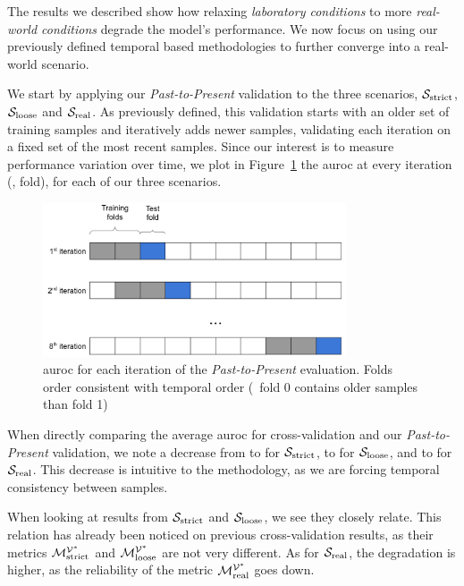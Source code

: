 The results we described show how relaxing \textit{laboratory conditions} to more \textit{real-world conditions} degrade the model's performance.
We now focus on using our previously defined temporal based methodologies to further converge into a real-world scenario.

\medskip

We start by applying our \textit{Past-to-Present} validation to the three scenarios, $\mathcal{S}_{\mathrm{strict}}$, $\mathcal{S}_{\mathrm{loose}}$ and $\mathcal{S}_{\mathrm{real}}$.
As previously defined, this validation starts with an older set of training samples and iteratively adds newer samples, validating each iteration on a fixed set of the most recent samples.
Since our interest is to measure performance variation over time, we plot in Figure~\ref{fig:pastpresent} the \gls{auroc} at every iteration (\ie, fold), for each of our three scenarios.

\begin{figure}[!htb]
	\centering
	\includegraphics[width=0.8\textwidth]{Figures/dia_slidingwindow.png}
	\caption[Single layer results for static features in \textit{Past-to-Present}.]{\gls{auroc} for each iteration of the \textit{Past-to-Present} evaluation. Folds order consistent with temporal order (\ie\ fold 0 contains older samples than
fold 1)}
	\label{fig:pastpresent}
\end{figure}

When directly comparing the average \gls{auroc} for cross-validation and our \textit{Past-to-Present} validation, we note a decrease from  to  for $\mathcal{S}_{\mathrm{strict}}$,  to  for $\mathcal{S}_{\mathrm{loose}}$, and  to  for $\mathcal{S}_{\mathrm{real}}$.
This decrease is intuitive to the methodology, as we are forcing temporal consistency between samples.

When looking at results from $\mathcal{S}_{\mathrm{strict}}$ and $\mathcal{S}_{\mathrm{loose}}$, we see they closely relate.
This relation has already been noticed on previous cross-validation results, as their metrics $\mathcal{M}_{\mathrm{strict}}^{\mathcal{V}^*}$ and $\mathcal{M}_{\mathrm{loose}}^{\mathcal{V}^*}$ are not very different.
As for $\mathcal{S}_{\mathrm{real}}$, the degradation is higher, as the reliability of the metric $\mathcal{M}_{\mathrm{real}}^{\mathcal{V}^*}$ goes down.

